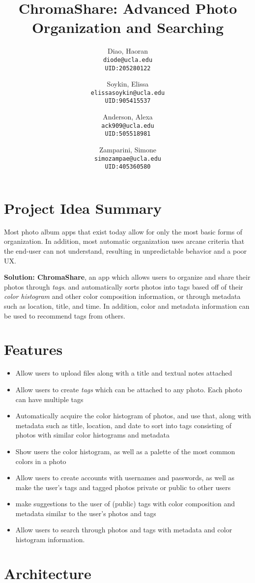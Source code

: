 \documentclass{article}
\title{ChromaShare: Advanced Photo Organization and Searching}
\author {
	Diao, Haoran\\ \texttt{diode@ucla.edu}\\ \texttt{UID:205280122}
	\and
	Soykin, Elissa\\ \texttt{elissasoykin@ucla.edu}\\ \texttt{UID:905415537}
	\and
	Anderson, Alexa\\ \texttt{ack909@ucla.edu}\\ \texttt{UID:505518981}
	\and
	Zamparini, Simone\\ \texttt{simozampae@ucla.edu}\\ \texttt{UID:405360580}
}
\begin{document}
\maketitle
\section{Project Idea Summary}
	Most photo album apps that exist today allow for only the most
	basic forms of organization. In addition, most automatic
	organization uses arcane criteria that the end-user can not understand,
	resulting in unpredictable behavior and a poor UX.

	\textbf{Solution: ChromaShare}, an app which allows users to organize
	and share their photos through \textit{tags}. and automatically sorts
	photos into tags based off of their \textit{color histogram} and other color
	composition information, or through metadata such as location, title,
	and time. In addition, color and metadata information can be used to
	recommend tags from others.
\section{Features}

	\begin{itemize}
		\item Allow users to upload files along with a title and textual
		notes attached
		\item Allow users to create \textit{tags} which can be attached
		to any photo. Each photo can have multiple tags
		\item Automatically acquire the color histogram of photos, and
		use that, along with metadata such as title, location, and date
		to sort into tags consisting of photos with similar color
		histograms and metadata
		\item Show users the color histogram, as well as a palette of
		the most common colors in a photo
		\item Allow users to create accounts with usernames and
		passwords, as well as make the user's tags and tagged photos
		private or public to other users
		\item make suggestions to the user of (public) tags with color
		composition and metadata similar to the user's photos and tags
		\item Allow users to search through photos and tags with
		metadata and color histogram information.
	\end{itemize}

\section{Architecture}
\end{document}
